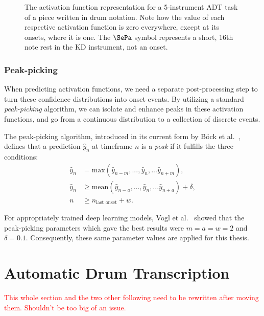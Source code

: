 \begin{figure}[H]
    \centering
    \hspace*{-0.5cm}
    
    \caption{The activation function representation for a 5-instrument \gls{ADT} task of a piece written in drum notation. Note how the value of each respective activation function is zero everywhere, except at its onsets, where it is one. The $\SePa$ symbol represents a short, 16th note rest in the \gls{KD} instrument, not an onset.}
    \label{ActivationsFigure}
\end{figure}

\subsubsection{Peak-picking}

When predicting activation functions, we need a separate post-processing step to turn these confidence distributions into onset events. By utilizing a standard \textit{peak-picking} algorithm, we can isolate and enhance peaks in these activation functions, and go from a continuous distribution to a collection of discrete events.

The peak-picking algorithm, introduced in its current form by Böck et al.~\cite{Bck2012EvaluatingTO}, defines that a prediction $\hat{y}_n$ at timeframe $n$ is a \textit{peak} if it fulfills the three conditions:
\begin{align*} 
    \hat{y}_n &= \text{max}(\hat{y}_{n - m}, ..., \hat{y}_n, ... \hat{y}_{n + m}), \\ 
    \hat{y}_n &\ge \text{mean}(\hat{y}_{n - a}, ..., \hat{y}_n, ... \hat{y}_{n + a}) + \delta, \\
    n &\ge n_\text{last onset} + w.
\end{align*}

For appropriately trained deep learning models, Vogl et al.~\cite{vogl2018multiinstrumentdrumtranscription} showed that the peak-picking parameters which gave the best results were $m = a = w = 2$ and $\delta = 0.1$. Consequently, these same parameter values are applied for this thesis.


\section{Automatic Drum Transcription}

\textcolor{red}{This whole section and the two other following need to be rewritten after moving them. Shouldn't be too big of an issue.}

